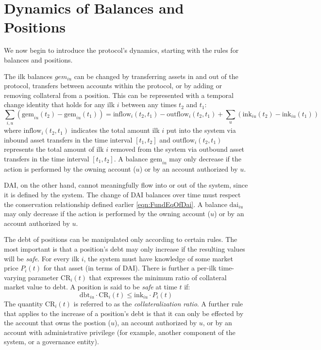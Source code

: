 \documentclass{article}
\begin{document}
\section{Dynamics of Balances and Positions}

We now begin to introduce the protocol's dynamics, starting with the rules for balances and positions.

The ilk balances \(gem_{iu}\) can be changed by transferring assets in and out of the protocol, transfers between accounts within the protocol, or by adding or removing collateral from a position. This can be
represented with a temporal change identity that holds for any ilk \(i\) between any times \(t_2\) and \(t_1\):
\begin{equation}
    \label{eqn:ColChangeIdent}
    \sum_{i,u} (\text{gem}_{iu}(t_2) - \text{gem}_{iu}(t_1)) = \text{inflow}_i(t_2, t_1) - \text{outflow}_i(t_2, t_1) + \sum_{u} (\text{ink}_{iu}(t_2) - \text{ink}_{iu}(t_1))
\end{equation}
where \(\text{inflow}_i(t_2,t_1)\) indicates the total amount ilk \(i\) put into the system via inbound asset transfers in the time interval \([t_1,t_2]\) and \(\text{outflow}_i(t_2,t_1)\) represents the total
amount of ilk \(i\) removed from the system via outbound asset transfers in the time interval \([t_1,t_2]\). A balance \(\text{gem}_{iu}\) may only decrease if the action is performed by the owning account
(\(u\)) or by an account authorized by \(u\).

DAI, on the other hand, cannot meaningfully flow into or out of the system, since it is defined by the system. The change of DAI balances over time must respect the conservation relationship defined earlier
\ref{eqn:FundEqOfDai}. A balance \(\text{dai}_{iu}\) may only decrease if the action is performed by the owning account (\(u\)) or by an account authorized by \(u\).

The debt of positions can be manipulated only according to certain rules. The most important is that a position's debt may only increase if the resulting values will be \emph{safe}. For every ilk \(i\), the
system must have knowledge of some market price \(P_i(t)\) for that asset (in terms of DAI). There is further a per-ilk time-varying parameter \(\text{CR}_i(t)\) that expresses the minimum ratio of collateral
market value to debt.  A position is said to be \emph{safe} at time \(t\) if:
\begin{equation}
    \text{dbt}_{iu} \cdot \text{CR}_i(t) \leq \text{ink}_{iu} \cdot P_i(t)
\end{equation}
The quantity \(\text{CR}_i(t)\) is referred to as the \emph{collateralization ratio}. A further rule that applies to the increase of a position's debt is that it can only be effected by the account that owns the
postion (\(u\)), an account authorized by \(u\), or by an account with administrative privilege (for example, another component of the system, or a governance entity).
\end{document}
